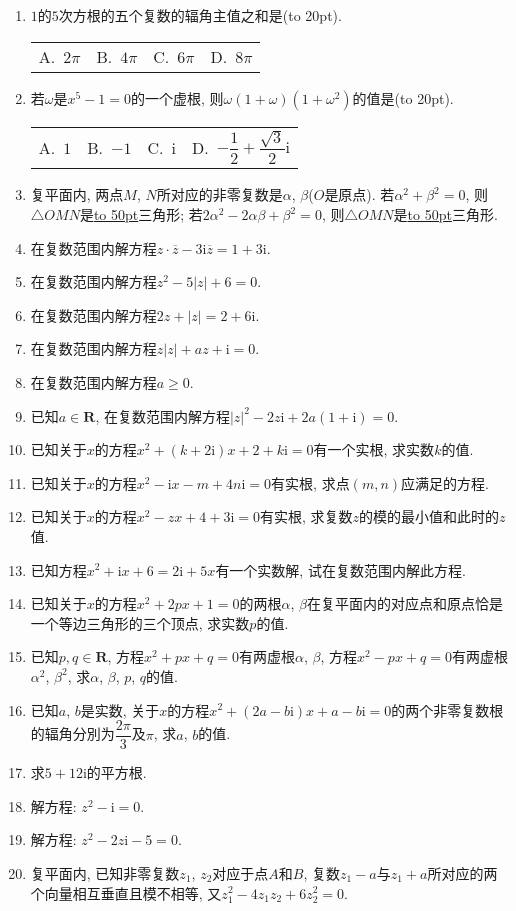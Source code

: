 \documentclass[10pt,a4paper]{article}
\newcommand{\blank}[1]{\underline{\hbox to #1pt{}}}
\newcommand{\bracket}[1]{(\hbox to #1pt{})}
\newcommand{\fourch}[4]{\par\begin{tabular}{p{.23\textwidth}p{.23\textwidth}p{.23\textwidth}p{.23\textwidth}}
A.~#1 &B.~#2& C.~#3& D.~#4
\end{tabular}}
\begin{document}
\begin{enumerate}[1.]
\item $1$的$5$次方根的五个复数的辐角主值之和是\bracket{20}.
\fourch{$2\pi$}{$4\pi$}{$6\pi$}{$8\pi$}
\item 若$\omega$是$x^5-1=0$的一个虚根, 则$\omega (1+\omega)(1+\omega ^2)$的值是\bracket{20}.
\fourch{$1$}{$-1$}{$\mathrm{i}$}{$-\dfrac 12+\dfrac{\sqrt 3}2\mathrm{i}$}
\item 复平面内, 两点$M$, $N$所对应的非零复数是$\alpha$, $\beta$($O$是原点). 若$\alpha ^2+\beta ^2=0$, 则$\triangle OMN$是\blank{50}三角形; 若$2\alpha ^2-2\alpha \beta +\beta ^2=0$, 则$\triangle OMN$是\blank{50}三角形.
\item 在复数范围内解方程$z\cdot \overline z-3\mathrm{i}\overline z=1+3\mathrm{i}$.
\item 在复数范围内解方程$z^2-5|z|+6=0$.
\item 在复数范围内解方程$2z+|z|=2+6\mathrm{i}$.
\item 在复数范围内解方程$z|z|+az+\mathrm{i}=0$.
\item 在复数范围内解方程$a\ge 0$.
\item 已知$a\in \mathbf{R}$, 在复数范围内解方程$|z|^2-2z\mathrm{i}+2a(1+\mathrm{i})=0$.
\item 已知关于$x$的方程$x^2+(k+2\mathrm{i})x+2+k\mathrm{i}=0$有一个实根, 求实数$k$的值.
\item 已知关于$x$的方程$x^2-\mathrm{i}x-m+4n\mathrm{i}=0$有实根, 求点$(m,n)$应满足的方程.
\item 已知关于$x$的方程$x^2-zx+4+3\mathrm{i}=0$有实根, 求复数$z$的模的最小值和此时的$z$值.
\item 已知方程$x^2+\mathrm{i}x+6=2\mathrm{i}+5x$有一个实数解, 试在复数范围内解此方程.
\item 已知关于$x$的方程$x^2+2px+1=0$的两根$\alpha$, $\beta$在复平面内的对应点和原点恰是一个等边三角形的三个顶点, 求实数$p$的值.
\item 已知$p,q\in \mathbf{R}$, 方程$x^2+px+q=0$有两虚根$\alpha$, $\beta$, 方程$x^2-px+q=0$有两虚根$\alpha ^2$, $\beta ^2$, 求$\alpha$, $\beta$, $p$, $q$的值.
\item 已知$a$, $b$是实数, 关于$x$的方程$x^2+(2a-b\mathrm{i})x+a-b\mathrm{i}=0$的两个非零复数根的辐角分別为$\dfrac{2\pi }3$及$\pi$, 求$a$, $b$的值.
\item 求$5+12\mathrm{i}$的平方根.
\item 解方程: $z^2-\mathrm{i}=0$.
\item 解方程: $z^2-2z\mathrm{i}-5=0$.
\item 复平面内, 已知非零复数$z_1$, $z_2$对应于点$A$和$B$, 复数$z_1-a$与$z_1+a$所对应的两个向量相互垂直且模不相等, 又$z_1^2-4z_1z_2+6z_2^2=0$.\\

\end{enumerate}
\end{document}
